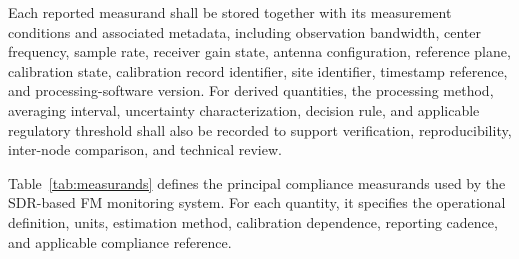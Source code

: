 \documentclass[11pt]{article}
\begin{document}
Each reported measurand shall be stored together with its measurement conditions and associated metadata, including observation bandwidth, center frequency, sample rate, receiver gain state, antenna configuration, reference plane, calibration state, calibration record identifier, site identifier, timestamp reference, and processing-software version. For derived quantities, the processing method, averaging interval, uncertainty characterization, decision rule, and applicable regulatory threshold shall also be recorded to support verification, reproducibility, inter-node comparison, and technical review.

Table~\ref{tab:measurands} defines the principal compliance measurands used by the SDR-based FM monitoring system. For each quantity, it specifies the operational definition, units, estimation method, calibration dependence, reporting cadence, and applicable compliance reference.
\end{document}
